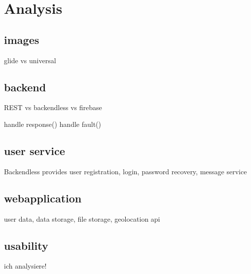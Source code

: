 \newpage
\chapter{Analysis}\label{cap:Analysis}

\section{images}
glide vs universal

\section{backend}
REST vs backendless vs firebase

handle response()
handle fault()
\section{user service}
Backendless provides user registration, login, password recovery, message service


\section{webapplication}
user data, data storage, file storage, geolocation api



\section{usability}
ich analysiere!